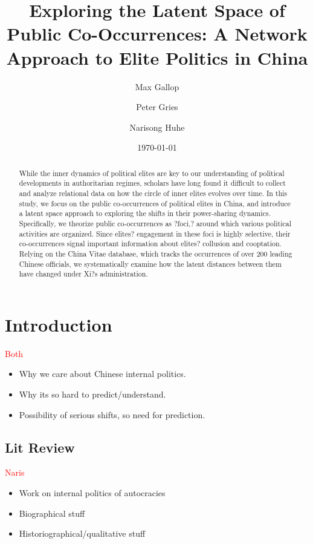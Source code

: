 \documentclass[12pt]{amsart}
\begin{document}
\title{Exploring the Latent Space of Public Co-Occurrences: A Network Approach to Elite Politics in China}
\author{Max Gallop}
\author{Peter Gries} 
\author{Narisong Huhe}
\date{\today}

\maketitle

\begin{abstract}
While the inner dynamics of political elites are key to our understanding of political developments in authoritarian regimes, scholars have long found it difficult to collect and analyze relational data on how the circle of inner elites evolves over time. In this study, we focus on the public co-occurrences of political elites in China, and introduce a latent space approach to exploring the shifts in their power-sharing dynamics. Specifically, we theorize public co-occurrences as ?foci,? around which various political activities are organized. Since elites? engagement in these foci is highly selective, their co-occurrences signal important information about elites? collusion and cooptation. Relying on the China Vitae database, which tracks the occurrences of over 200 leading Chinese officials, we systematically examine how the latent distances between them have changed under Xi?s administration.
\end{abstract}

\section{Introduction}
\textcolor{red}{Both}
\begin{itemize}
\item Why we care about Chinese internal politics.
\item Why its so hard to predict/understand.
\item Possibility of serious shifts, so need for prediction.
\end{itemize}
\subsection{Lit Review}
\textcolor{red}{Naris}
\begin{itemize}
\item Work on internal politics of autocracies
\item Biographical stuff
\item Historiographical/qualitative stuff
\end{itemize}
\end{document}
